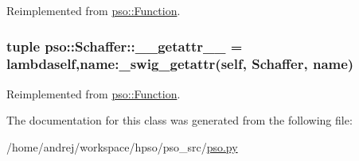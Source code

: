 Reimplemented from \hyperlink{classpso_1_1Function_5bddc07dbaab0ee579488bdcc8103a71}{pso::Function}.\hypertarget{classpso_1_1Schaffer_98f17a1e02482e4ff12b9f886defc04f}{
\subsubsection{\setlength{\rightskip}{0pt plus 5cm}tuple {\bf pso::Schaffer::\_\-\_\-getattr\_\-\_\-} = lambdaself,name:\_\-swig\_\-getattr(self, {\bf Schaffer}, name)}}
\label{classpso_1_1Schaffer_98f17a1e02482e4ff12b9f886defc04f}




Reimplemented from \hyperlink{classpso_1_1Function_affeed856b337656e88895fa35321496}{pso::Function}.

The documentation for this class was generated from the following file:\begin{CompactItemize}
\item 
/home/andrej/workspace/hpso/pso\_\-src/\hyperlink{pso_8py}{pso.py}\end{CompactItemize}
